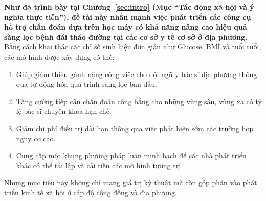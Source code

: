 \documentclass[14pt,a4paper]{extreport}
\begin{document}
\textbf{Như đã trình bày tại Chương~\ref{sec:intro} (Mục ``Tác động xã hội và ý nghĩa thực tiễn''), đề tài này nhấn mạnh việc phát triển các công cụ hỗ trợ chẩn đoán dựa trên học máy có khả năng nâng cao hiệu quả sàng lọc bệnh đái tháo đường tại các cơ sở y tế cơ sở ở địa phương.} Bằng cách khai thác các chỉ số sinh hiệu đơn giản như Glucose, BMI và tuổi tuổi, các mô hình được xây dựng có thể:
\begin{enumerate}
  \item Giúp giảm thiểu gánh nặng công việc cho đội ngũ y bác sĩ địa phương thông qua tự động hóa quá trình sàng lọc ban đầu.
  \item Tăng cường tiếp cận chẩn đoán công bằng cho những vùng sâu, vùng xa có tỷ lệ bác sĩ chuyên khoa hạn chế.
  \item Giảm chi phí điều trị dài hạn thông qua việc phát hiện sớm các trường hợp nguy cơ cao.
  \item Cung cấp một khung phương pháp luận minh bạch để các nhà phát triển khác có thể tái lập và cải tiến các mô hình tương tự.
\end{enumerate}

Những mục tiêu này không chỉ mang giá trị kỹ thuật mà còn góp phần vào phát triển kinh tế xã hội ở cảp độ cộng đồng và địa phương.

\newpage
\printbibliography[title={Tài liệu tham khảo}]
\end{document}
